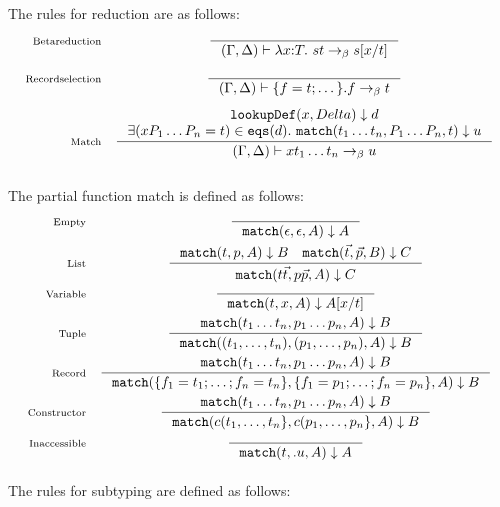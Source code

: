 \documentclass{article}
\newcommand{\fn}[1]{\mathtt{#1}}
\newcommand{\lamexpr}[3]{\lambda {#1}{:}{#2}.\ {#3}}
\newcommand{\rlbl}[1]{\mathrm{\scriptstyle{}#1}}
\begin{document}
\newcommand{\pmatch}[4]{\fn{match}(#1,#2,#3) \downarrow #4}

The rules for reduction are as follows:
\begin{gather*}
\begin{array}{rc}
\rlbl{Beta reduction} &
\inference{}{\defctx{} |- \lamexpr{x}{T}{s} t  \red{} s[x/t]}\\[1.5em]
\rlbl{Record selection} &
\inference{}{\defctx{} |- \{ f = t; \dots \}.f \red{} t}\\[1.5em]
\rlbl{Match} &
\inference{\fn{lookupDef}(x,Delta) \downarrow d\\
            \exists (x P_1 \dots P_n = t) \in \fn{eqs}(d).
              \ \pmatch{t_1 \dots t_n}{P_1 \dots P_n}{t}{u}}
          {\defctx{} |- x t_1 \dots t_n \red{} u}\\[1.5em]
\end{array}
\end{gather*}



The partial function match is defined as follows:
\[
\begin{array}{rc}
\rlbl{Empty}&
\inference{}{\pmatch{\epsilon}{\epsilon}{A}{A}}\\[1em]
\rlbl{List}&
\inference{\pmatch{t}{p}{A}{B}
    \quad  \pmatch{\vec{t}}{\vec{p}}{B}{C}}
          {\pmatch{t \vec{t}}{p \vec{p}}{A}{C}}\\[1em]
\rlbl{Variable}&
\inference{}
          {\pmatch{t}{x}{A}{A[x/t]}}\\[1em]
\rlbl{Tuple}&
\inference{\pmatch{t_1 \dots t_n}{p_1 \dots p_n}{A}{B}}
          {\pmatch{(t_1, \dots, t_n)}{(p_1, \dots, p_n)}{A}{B}}\\[1em]
\rlbl{Record}&
\inference{\pmatch{t_1 \dots t_n}{p_1 \dots p_n}{A}{B}}
          {\pmatch{\{ f_1 = t_1; \dots; f_n = t_n\}}
                  {\{ f_1 = p_1; \dots; f_n = p_n\}}
                  {A}
                  {B}}\\[1em]
\rlbl{Constructor}&
\inference{\pmatch{t_1 \dots t_n}{p_1 \dots p_n}{A}{B}}
          {\pmatch{c(t_1, \dots, t_n\}}
                  {c(p_1, \dots, p_n\}}
                  {A}
                  {B}}\\[1em]
\rlbl{Inaccessible}&
\inference{}
          {\pmatch{t}{.u}{A}{A}}\\[1em]
\end{array}
\]

The rules for subtyping are defined as follows:
\end{document}
